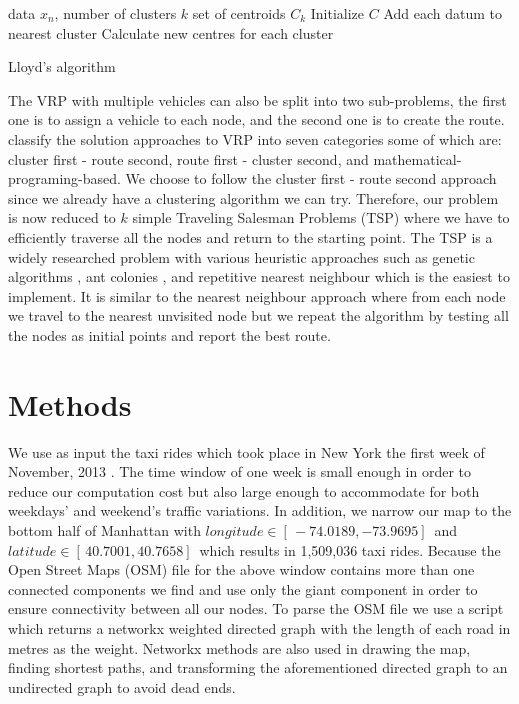 \documentclass{article}
\begin{document}
\begin{algorithm}[ht]
	\begin{algorithmic}
		 data $x_n$, number of clusters $k$
		 set of centroids $C_k$
		\STATE Initialize $C$
		\REPEAT
		\STATE Add each datum to nearest cluster
		\STATE Calculate new centres for each cluster
	\end{algorithmic}
	\caption{Lloyd's algorithm}
	\label{alg:lloyd}
\end{algorithm}

The VRP with multiple vehicles can also be split into two sub-problems, the first one is to assign a vehicle to each node, and the second one is to create the route. \citet{bodin_classification_1981} classify the solution approaches to VRP into seven categories some of which are: cluster first - route second, route first - cluster second, and mathematical-programing-based. We choose to follow the cluster first - route second approach since we already have a clustering algorithm we can try. Therefore, our problem is now reduced to $k$ simple Traveling Salesman Problems (TSP) where we have to efficiently traverse all the nodes and return to the starting point. The TSP is a widely researched problem with various heuristic approaches such as genetic algorithms \citep[p.160]{grefenstette_proceedings_2014}, ant colonies \citep{dorigo_ant_1997}, and repetitive nearest neighbour \citep{klug_k-rnn:_2018} which is the easiest to implement. It is similar to the nearest neighbour approach where from each node we travel to the nearest unvisited node but we repeat the algorithm by testing all the nodes as initial points and report the best route.

\section{Methods}\label{sec:methods}
We use as input the taxi rides which took place in New York the first week of November, 2013 \citep{donovan_new_2016}. The time window of one week is small enough in order to reduce our computation cost but also large enough to accommodate for both weekdays' and weekend's traffic variations. In addition, we narrow our map to the bottom half of Manhattan with $longitude\in[ \,-74.0189, -73.9695] \,$ and $latitude\in[ \,40.7001, 40.7658] \,$ which results in 1,509,036 taxi rides. Because the Open Street Maps (OSM) file for the above window contains more than one connected components we find and use only the giant component in order to ensure connectivity between all our nodes. To parse the OSM file we use a script \citep{messal_osmparser.py_2017} which returns a networkx \cite{hagberg_exploring_2008} weighted directed graph with the length of each road in metres as the weight. Networkx  methods are also used in drawing the map, finding shortest paths, and transforming the aforementioned directed graph to an undirected graph to avoid dead ends.
\end{document}
